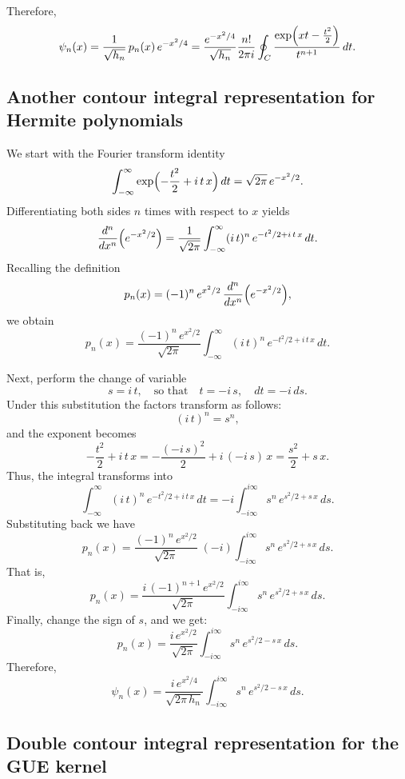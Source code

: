 \documentclass[letterpaper,11pt,oneside,reqno]{article}
\numberwithin{equation}{section}
\theoremstyle{definition}
\begin{document}
Therefore,
\begin{equation*}
	\psi_n(x)=\frac{1}{\sqrt{h_n}}\,p_n(x)\,e^{-x^2/4}=
	\frac{e^{-x^2/4}}{\sqrt{h_n}}\frac{n!}{2\pi i}\oint_C\frac{\exp\Bigl(xt-\frac{t^2}{2}\Bigr)}{t^{n+1}}\,dt.
\end{equation*}

\subsection{Another contour integral representation for Hermite polynomials}

We start with the Fourier transform identity
\[
\int_{-\infty}^{\infty} \exp\Bigl(-\frac{t^2}{2} + i\,t\,x\Bigr)\,dt
=\sqrt{2\pi}\,e^{-x^2/2}.
\]
Differentiating both sides \(n\) times with respect to \(x\) yields
\[
\frac{d^n}{dx^n}\Bigl(e^{-x^2/2}\Bigr)
=\frac{1}{\sqrt{2\pi}}\int_{-\infty}^{\infty} (i\,t)^n\,e^{-t^2/2+ i\,t\,x}\,dt.
\]
Recalling the definition
\[
p_n(x)=(-1)^n\,e^{x^2/2}\,\frac{d^n}{dx^n}\Bigl(e^{-x^2/2}\Bigr),
\]
we obtain
\[
p_n(x)=\frac{(-1)^n\,e^{x^2/2}}{\sqrt{2\pi}}\int_{-\infty}^{\infty}(i\,t)^n\,e^{-t^2/2+ i\,t\,x}\,dt.
\]

Next, perform the change of variable
\[
s=i\,t,\quad\text{so that}\quad t=-i\,s,\quad dt=-i\,ds.
\]
Under this substitution the factors transform as follows:
\[
(i\,t)^n = s^n,
\]
and the exponent becomes
\[
-\frac{t^2}{2}+ i\,t\,x
= -\frac{(-i\,s)^2}{2}+ i\,(-i\,s)\,x
= \frac{s^2}{2}+ s\,x.
\]
Thus, the integral transforms into
\[
\int_{-\infty}^{\infty}(i\,t)^n\,e^{-t^2/2+ i\,t\,x}\,dt
= -i \int_{-i\infty}^{i\infty} s^n\,e^{s^2/2+ s\,x}\,ds.
\]
Substituting back we have
\[
p_n(x)=\frac{(-1)^n\,e^{x^2/2}}{\sqrt{2\pi}}\;(-i)
\int_{-i\infty}^{i\infty} s^n\,e^{s^2/2+ s\,x}\,ds.
\]
That is,
\[
p_n(x)=\frac{i\,(-1)^{n+1}\,e^{x^2/2}}{\sqrt{2\pi}}
\int_{-i\infty}^{i\infty} s^n\,e^{s^2/2+ s\,x}\,ds.
\]
Finally, change the sign of $s$, and we get:
\[
p_n(x)=\frac{i\,e^{x^2/2}}{\sqrt{2\pi}}
\int_{-i\infty}^{i\infty} s^n\,e^{s^2/2- s\,x}\,ds.
\]
Therefore,
\[
\psi_n(x)=\frac{i\,e^{x^2/4}}{\sqrt{2\pi\,h_n}}
\int_{-i\infty}^{i\infty} s^n\,e^{s^2/2- s\,x}\,ds.
\]

\subsection{Double contour integral representation for the GUE kernel}
\end{document}
